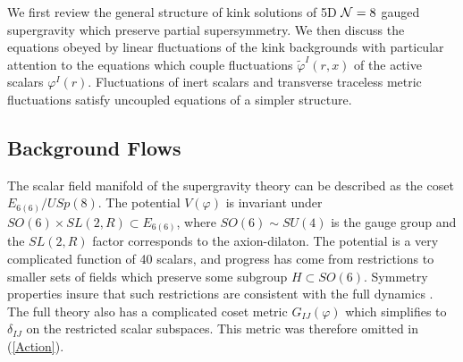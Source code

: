 \documentclass[a4paper,12pt]{article}
\def\varphit{\tilde{\varphi}}
\begin{document}
We first review the general structure of kink solutions of 5D ${\cal
N}=8$ gauged supergravity which preserve partial supersymmetry. We
then discuss the equations obeyed by linear fluctuations of the kink
backgrounds with particular attention to the equations which couple
fluctuations $\varphit^I(r,x)$ of the active scalars $\varphi^I(r)$.
Fluctuations of inert scalars and transverse traceless metric
fluctuations satisfy uncoupled equations of a simpler structure.

\subsection{Background Flows}

The scalar field manifold of the supergravity theory can be described
as the coset $E_{6(6)}/USp(8)$. The potential $V(\varphi)$ is
invariant under $SO(6) \times SL(2, R) \subset E_{6(6)}$, where $SO(6)
\sim SU(4)$ is the gauge group and the $SL(2,R)$ factor corresponds to
the axion-dilaton. The potential is a very complicated function of 40
scalars, and progress has come from restrictions to smaller sets of
fields which preserve some subgroup $H \subset SO(6)$. Symmetry
properties insure that such restrictions are consistent with the full
dynamics \cite{warnerold}.  The full theory also has a complicated
coset metric $G_{IJ}(\varphi)$ which simplifies to $\delta_{IJ}$ on
the restricted scalar subspaces. This metric was therefore omitted in
(\ref{Action}).
\end{document}
